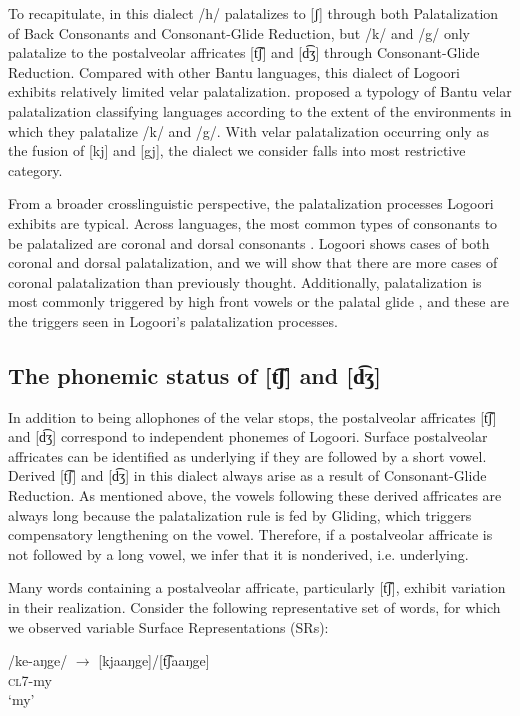 \documentclass[output=paper]{langsci/langscibook}
\begin{document}
To recapitulate, in this dialect /h/ palatalizes to [ʃ] through both Palatalization of Back Consonants and Consonant-Glide Reduction, but /k/ and /g/ only palatalize to the postalveolar affricates [t͡ʃ] and [d͡ʒ] through Consonant-Glide Reduction. Compared with other Bantu languages, this dialect of Logoori exhibits relatively limited velar palatalization. \citet{HymanMoxley1996} proposed a typology of Bantu velar palatalization classifying languages according to the extent of the environments in which they palatalize /k/ and /g/. With velar palatalization occurring only as the fusion of [kj] and [gj], the dialect we consider falls into  most restrictive category. 

From a broader crosslinguistic perspective, the palatalization processes Logoori exhibits are typical. Across languages, the most common types of consonants to be palatalized are coronal and dorsal consonants \citep{Bateman2011}. Logoori shows cases of both coronal and dorsal palatalization, and we will show that there are more cases of coronal palatalization than previously thought. Additionally, palatalization is most commonly triggered by high front vowels or the palatal glide \citep{Bateman2011}, and these are the triggers seen in Logoori’s palatalization processes.

\subsection{The phonemic status of [t͡ʃ] and [d͡ʒ]} %

In addition to being allophones of the velar stops, the postalveolar affricates [t͡ʃ] and [d͡ʒ] correspond to independent phonemes of Logoori. Surface postalveolar affricates can be identified as underlying if they are followed by a short vowel. Derived [t͡ʃ] and [d͡ʒ] in this dialect always arise as a result of Consonant-Glide Reduction. As mentioned above, the vowels following these derived affricates are always long because the palatalization rule is fed by Gliding, which triggers compensatory lengthening on the vowel. Therefore, if a postalveolar affricate is not followed by a long vowel, we infer that it is nonderived, i.e. underlying.

Many words containing a postalveolar affricate, particularly [t͡ʃ], exhibit variation in their realization. Consider the following representative set of words, for which we observed variable Surface Representations (SRs): 


\ea\label{ex:glewwe:11}{}
  \ea\label{ex:glewwe:11a}
 /ke-aŋge/  $\rightarrow$ [kjaaŋge]/[t͡ʃaaŋge]\\{}
\textsc{cl7}-my\\{}
\glt ‘my’
\end{document}

